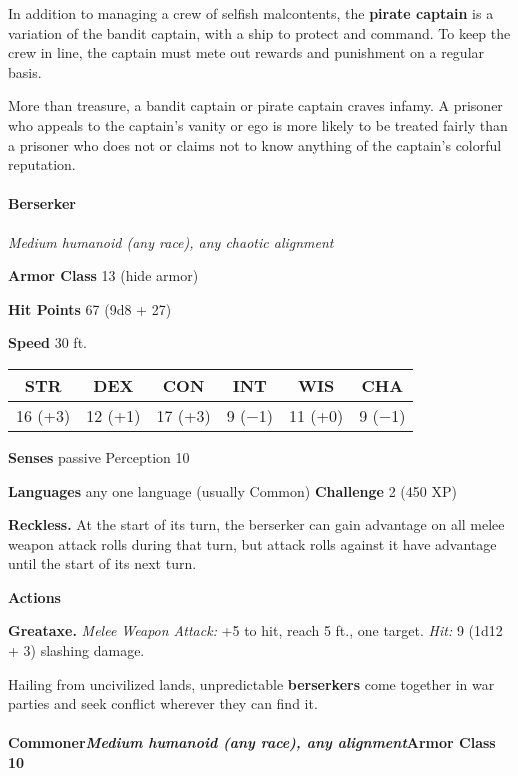 \documentclass[
]{article}
\begin{document}
In addition to managing a crew of selfish malcontents, the
\textbf{pirate captain} is a variation of the bandit captain, with a
ship to protect and command. To keep the crew in line, the captain must
mete out rewards and punishment on a regular basis.

More than treasure, a bandit captain or pirate captain craves infamy. A
prisoner who appeals to the captain's vanity or ego is more likely to be
treated fairly than a prisoner who does not or claims not to know
anything of the captain's colorful reputation.

\hypertarget{berserker}{%
\paragraph{Berserker}\label{berserker}}

\emph{Medium humanoid (any race), any chaotic alignment}

\textbf{Armor Class} 13 (hide armor)

\textbf{Hit Points} 67 (9d8 + 27)

\textbf{Speed} 30 ft.

\begin{longtable}[]{@{}cccccc@{}}
\toprule
STR & DEX & CON & INT & WIS & CHA\tabularnewline
\midrule
\endhead
16 (+3) & 12 (+1) & 17 (+3) & 9 (−1) & 11 (+0) & 9 (−1)\tabularnewline
\bottomrule
\end{longtable}

\textbf{Senses} passive Perception 10

\textbf{Languages} any one language (usually Common) \textbf{Challenge}
2 (450 XP)

\textbf{Reckless.} At the start of its turn, the berserker can gain
advantage on all melee weapon attack rolls during that turn, but attack
rolls against it have advantage until the start of its next turn.

\textbf{Actions}

\textbf{Greataxe.} \emph{Melee Weapon Attack:} +5 to hit, reach 5 ft.,
one target. \emph{Hit:} 9 (1d12 + 3) slashing damage.

Hailing from uncivilized lands, unpredictable \textbf{berserkers} come
together in war parties and seek conflict wherever they can find it.

\hypertarget{commonermedium-humanoid-any-race-any-alignmentarmor-class-10}{%
\paragraph{\texorpdfstring{Commoner\emph{Medium humanoid (any race), any
alignment}\textbf{Armor Class}
10}{CommonerMedium humanoid (any race), any alignmentArmor Class 10}}\label{commonermedium-humanoid-any-race-any-alignmentarmor-class-10}}
\end{document}

